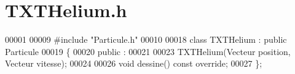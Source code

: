 \section{T\+X\+T\+Helium.\+h}
\label{_t_x_t_helium_8h_source}

\begin{DoxyCode}
00001 
00009 \textcolor{preprocessor}{#include "Particule.h"}
00010 
00018 \textcolor{keyword}{class }TXTHelium : \textcolor{keyword}{public} Particule
00019 \{
00020     \textcolor{keyword}{public} :
00021     
00023     TXTHelium(Vecteur position, Vecteur vitesse);
00024     
00026     \textcolor{keywordtype}{void} dessine() \textcolor{keyword}{const override};
00027 \};
\end{DoxyCode}

